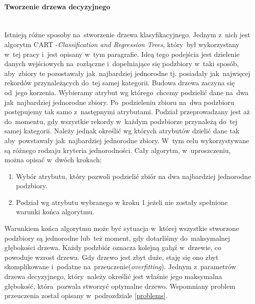 \paragraph{Tworzenie drzewa decyzyjnego}\mbox{}\\
Istnieją różne sposoby na~stworzenie drzewa klasyfikacyjnego. Jednym z~nich jest algorytm CART -\textit{Classification  and  Regression  Trees}, który~był wykorzystany w~tej pracy i~jest opisany w~tym paragrafie. Ideą tego podejścia jest dzielenie danych wejściowych na~rozłączne i~dopełniające się podzbiory w~taki sposób, aby~zbiory te pozostawały jak~najbardziej jednorodne tj. posiadały jak~najwięcej rekordów przynależących do~tej samej kategorii. Budowa drzewa zaczyna się od~jego korzenia. Wybieramy atrybut wg którego~chcemy podzielić dane na~dwa jak~najbardziej jednorodne zbiory. Po~podzieleniu zbioru na~dwa podzbioru postępujemy tak samo z~następnymi atrybutami. Podział przeprowadzany jest aż do~momentu, gdy wszystkie rekordy w~każdym podzbiorze przynależą do~tej samej kategorii. Należy jednak określić wg których atrybutów dzielić dane tak aby~powstawały jak~najbardziej jednorodne zbiory. W~tym celu wykorzystywane są różnego rodzaju kryteria jednorodności\cite{CART}. Cały algorytm, w~uproszczeniu, można opisać w~dwóch krokach:
\begin{enumerate}
\item Wybór atrybutu, który pozwoli podzielić zbiór na dwa najbardziej jednorodne podzbiory.
\item Podział wg atrybutu wybranego w kroku 1 jeżeli nie zostały spełnione warunki końca algorytmu\cite{CART}.
\end{enumerate}
Warunkiem końca algorytmu może być sytuacja w~której wszystkie stworzone podzbiory są jednorodne lub~też moment, gdy dotarliśmy do~maksymalnej głębokości drzewa. Każdy podzbiór oznacza kolejną gałąź w~drzewie, co powoduje wzrost drzewa. Gdy drzewo jest zbyt duże, staję się ono zbyt skomplikowane i~podatne na~przeuczenie(\textit{overfitting}). Jednym z~parametrów drzewa decyzyjnego, który~należy określić jest właśnie jego maksymalna głębokość, która~pozwala stworzyć optymalne drzewo. Wspomniany problem przeuczenia został opisany w~podrozdziale \ref{problems}. 

